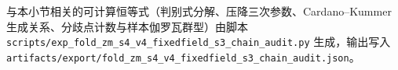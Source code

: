 \begin{remark}[代数审计输出]\label{rem:cdim-s4-v4-resolvent-prym-audit-script}
与本小节相关的可计算恒等式（判别式分解、压降三次参数、Cardano--Kummer 生成关系、分歧点计数与样本伽罗瓦群型）由脚本
\texttt{scripts/exp\_fold\_zm\_s4\_v4\_fixedfield\_s3\_chain\_audit.py}
生成，输出写入
\texttt{artifacts/export/fold\_zm\_s4\_v4\_fixedfield\_s3\_chain\_audit.json}。
\end{remark}


